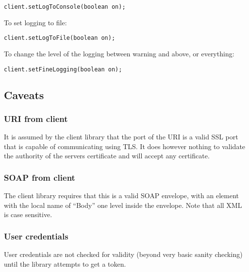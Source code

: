 \begin{lstlisting}[caption={Turn logging to console on or off}, label=userguideTogglelogtoconsole]
    client.setLogToConsole(boolean on);
\end{lstlisting}

    To set logging to file:
    
\begin{lstlisting}[caption={Turn logging to file on or off}, label=userguideTogglelogtofile]
    client.setLogToFile(boolean on);
\end{lstlisting}

    To change the level of the logging between warning and above, or everything:

\begin{lstlisting}[caption={Switch between the two logging scopes}, label=userguideToggleloggingdetails]
    client.setFineLogging(boolean on);
\end{lstlisting}

\subsection{Caveats}\label{userguideCaveats}
    
    \subsubsection{URI from client}
    
    It is assumed by the client library that the port of the URI is a valid SSL port that is capable of communicating using TLS. It does however nothing to validate the authority of the servers certificate and will accept any certificate.

    \subsubsection{SOAP from client}
    
    The client library requires that this is a valid SOAP envelope, with an element with the local name of “Body” one level inside the envelope. Note that all XML is case sensitive.

    \subsubsection{User credentials}
    
    User credentials are not checked for validity (beyond very basic sanity checking) until the library attempts to get a token.
    
